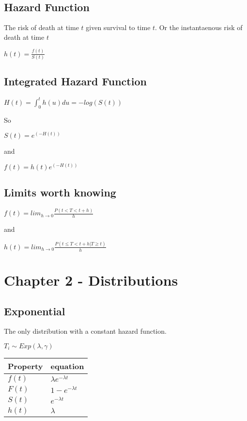\documentclass[
  letterpaper,
  DIV=11,
  numbers=noendperiod]{scrreprt}
\begin{document}
\hypertarget{hazard-function}{%
\subsection{Hazard Function}\label{hazard-function}}

The risk of death at time \(t\) given survival to time \(t\). Or the
instantaenous risk of death at time \(t\)

\(h(t) = \frac{f(t)}{S(t)}\)

\hypertarget{integrated-hazard-function}{%
\subsection{Integrated Hazard
Function}\label{integrated-hazard-function}}

\(H(t) = \int^{t}_0 h(u) du = -log(S(t))\)

So

\(S(t) = e^{\left(-H(t)\right)}\)

and

\(f(t) = h(t)e^{\left(-H(t)\right)}\)

\hypertarget{limits-worth-knowing}{%
\subsection{Limits worth knowing}\label{limits-worth-knowing}}

\(f(t) = lim_{h \rightarrow 0 } \frac{P(t < T < t+h)}{h}\)

and

\(h(t) = lim_{h \rightarrow 0 } \frac{P(t \leq T < t+h | T \geq t)}{h}\)

\hypertarget{chapter-2---distributions}{%
\section{Chapter 2 - Distributions}\label{chapter-2---distributions}}

\hypertarget{exponential}{%
\subsection{Exponential}\label{exponential}}

The only distribution with a constant hazard function.

\(T_i \sim Exp(\lambda, \gamma)\)

\begin{longtable}[]{@{}ll@{}}
\toprule()
Property & equation \\
\midrule()
\endhead
\(f(t)\) & \(\lambda e^{-\lambda t}\) \\
\(F(t)\) & \(1 - e^{-\lambda t}\) \\
\(S(t)\) & \(e^{-\lambda t}\) \\
\(h(t)\) & \(\lambda\) \\
\bottomrule()
\end{longtable}
\end{document}
